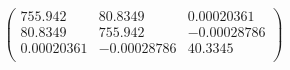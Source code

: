 \documentclass{article}
\begin{document}
\[\left(
\begin{array}{ccc}
 755.942 & 80.8349 & 0.00020361 \\
 80.8349 & 755.942 & -0.00028786 \\
 0.00020361 & -0.00028786 & 40.3345 \\
\end{array}
\right)\]
\end{document}

